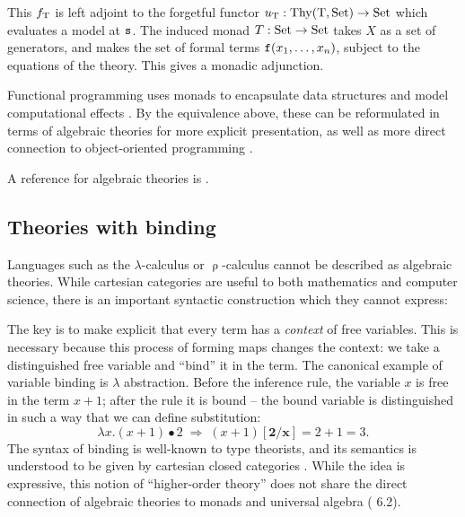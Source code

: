 \documentclass[stthol.tex]{subfiles}
\begin{document}
This $f_{\mathrm{T}}$ is left adjoint to the forgetful functor $u_{\mathrm{T}}:\mathrm{Thy}(\mathrm{T},\mathrm{Set})\to \mathrm{Set}$ which evaluates a model at $\mathtt{s}$. The induced monad $T:\mathrm{Set}\to \mathrm{Set}$ takes $X$ as a set of generators, and makes the set of formal terms $\mathtt{f}(x_1,\dots,x_n)$, subject to the equations of the theory. This gives a monadic adjunction.

Functional programming uses monads to encapsulate data structures and model computational effects \cite{moggi}. By the equivalence above, these can be reformulated in terms of algebraic theories for more explicit presentation, as well as more direct connection to object-oriented programming \cite{hylandpower}.

A reference for algebraic theories is \cite{algthys}.

\subsection{Theories with binding}
\label{ssec:bind}

Languages such as the $\lambda$-calculus or $\uprho$-calculus cannot be described as algebraic theories. While cartesian categories are useful to both mathematics and computer science, there is an important syntactic construction which they cannot express: 

The key is to make explicit that every term has a \textit{context} of free variables. This is necessary because this process of forming maps changes the context: we take a distinguished free variable and ``bind'' it in the term. The canonical example of variable binding is $\lambda$ abstraction.
Before the inference rule, the variable $x$ is free in the term $x+1$; after the rule it is bound -- the bound variable is distinguished in such a way that we can define substitution:
$$\lambda x.(x+1)\bullet 2 \; \Rightarrow \; (x+1)\mathbf{[2/x]} = 2+1 = 3.$$
The syntax of binding is well-known to type theorists, and its semantics is understood to be given by cartesian closed categories \cite{holog}. While the idea is expressive, this notion of ``higher-order theory'' does not share the direct connection of algebraic theories to monads and universal algebra (\cite{twodim} 6.2).
\end{document}
